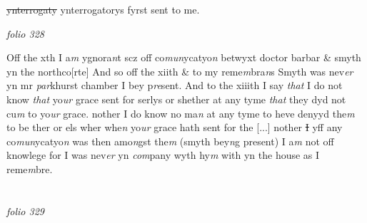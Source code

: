\documentclass[12pt, a4paper]{book}
\begin{document}
               \sout{ynterrogaty }ynterrogatorys fyrst sent to me.

\dotfill
					

\textit{folio 328}



				\marginpar[\vspace{0.5cm}{\textcolor{Gray}{10}}]{}
			 Off the xth I a\textit{m} ygnora\textit{n}t scz off co\textit{mun}ycatyo\textit{n} betwyxt doctor barbar \& smyth yn the northco[rte] 
				\marginpar[\vspace{0.5cm}{\textcolor{Gray}{12}}]{}
			 And so off the xiith \& to my reme\textit{m}bra\textit{n}s Smyth was nev\textit{er }yn mr \textit{par}khurst chamber I bey p\textit{re}sent. 
				\marginpar[\vspace{0.5cm}{\textcolor{Gray}{13}}]{}
			 And to the xiiith I say \textit{that} I do not know \textit{that} yo\textit{ur} grace sent for serlys or shether at any tyme \textit{that} they dyd not cu\textit{m} to yo\textit{ur} grace. nother I do know no ma\textit{n }at any tyme to heve denyyd the\textit{m} to be ther or els wher whe\textit{n} yo\textit{ur} grace hath sent for the
				[...]
			 nother \sout{I} yff any co\textit{mun}ycatyo\textit{n} was then amo\textit{n}gst the\textit{m} (smyth bey\textit{n}g present) I a\textit{m} not off knowlege for I was nev\textit{er} yn \textit{com}pany wyth hy\textit{m} with yn the house as I  reme\textit{m}bre. 
               
\dotfill
					  \section*{}

\textit{folio 329}
\end{document}
